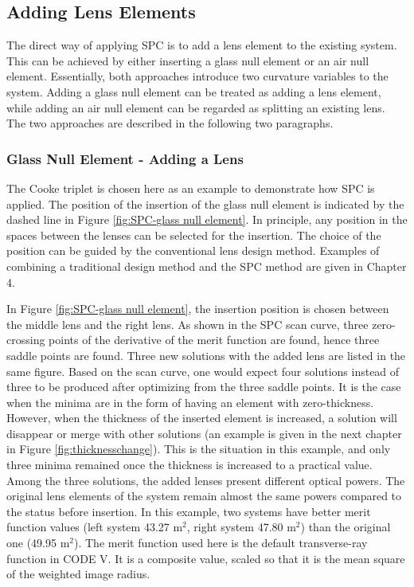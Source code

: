 \subsection{Adding Lens Elements}
The direct way of applying SPC is to add a lens element to the existing system. This can be achieved by either inserting a glass null element or an air null element. Essentially, both approaches introduce two curvature variables to the system. Adding a glass null element can be treated as adding a lens element, while adding an air null element can be regarded as splitting an existing lens. The two approaches are described in the following two paragraphs.

\subsubsection{Glass Null Element - Adding a Lens}
The Cooke triplet is chosen here as an example to demonstrate how SPC is applied. 
The position of the insertion of the glass null element is indicated by the dashed line in Figure \ref{fig:SPC-glass null element}. In principle, any position in the spaces between the lenses can be selected for the insertion. The choice of the position can be guided by the conventional lens design method. Examples of combining a traditional design method and the SPC method are given in Chapter 4.

In Figure \ref{fig:SPC-glass null element}, the insertion position is chosen between the middle lens and the right lens. As shown in the SPC scan curve, three zero-crossing points of the derivative of the merit function are found, hence three saddle points are found. Three new solutions with the added lens are listed in the same figure. Based on the scan curve, one would expect four solutions instead of three to be produced after optimizing from the three saddle points. It is the case when the minima are in the form of having an element with zero-thickness. However, when the thickness of the inserted element is increased, a solution will disappear or merge with other solutions (an example is given in the next chapter in Figure \ref{fig:thicknesschange}). This is the situation in this example, and only three minima remained once the thickness is increased to a practical value. Among the three solutions, the added lenses present different optical powers. The original lens elements of the system remain almost the same powers compared to the status before insertion. In this example, two systems have better merit function values (left system 43.27 \textmu m$^2$, right system 47.80 \textmu m$^2$) than the original one (49.95 \textmu m$^2$). The merit function used here is the default transverse-ray function in CODE V. It is a composite value, scaled so that it is the mean square of the weighted image radius.

